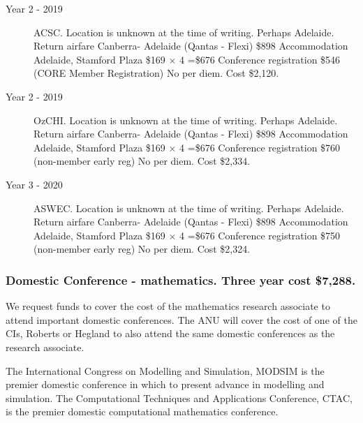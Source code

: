\documentclass[a4paper,fontsize=12pt]{scrartcl}
\begin{document}
\begin{description}


\item[Year 2 - 2019] ACSC.
Location is unknown at the time of writing. Perhaps Adelaide.
Return airfare Canberra- Adelaide (Qantas - Flexi) \$898
Accommodation Adelaide, Stamford Plaza \$169 $\times$ 4 =\$676
Conference registration \$546 (CORE Member Registration)
No per diem. Cost \$2,120.

\item[Year 2 - 2019] OzCHI.
Location is unknown at the time of writing. Perhaps Adelaide.
Return airfare Canberra- Adelaide (Qantas - Flexi) \$898
Accommodation Adelaide, Stamford Plaza \$169 $\times$ 4 =\$676
Conference registration \$760 (non-member early reg)
No per diem. Cost \$2,334.

\item[Year 3 -  2020] ASWEC.
Location is unknown at the time of writing. Perhaps Adelaide.
Return airfare Canberra- Adelaide (Qantas - Flexi) \$898
Accommodation Adelaide, Stamford Plaza \$169 $\times$ 4 =\$676
Conference registration \$750 (non-member early reg)
No per diem. Cost \$2,324.


\end{description}



\subsubsection*{Domestic Conference - mathematics. Three year cost \$7,288.}

We request funds to cover the cost of the mathematics research associate to attend important domestic conferences.  The ANU will cover the cost of one of the CIs, Roberts or Hegland to also attend the same domestic conferences as the research associate. 

The International Congress on Modelling and Simulation, MODSIM is the premier domestic conference in which to present advance in modelling and simulation. 
The Computational Techniques and Applications Conference, CTAC, is the premier domestic computational mathematics conference.
\end{document}
